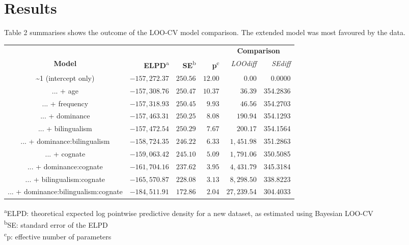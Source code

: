 \documentclass[
  english,
  man,man,floatsintext]{apa6}
\begin{document}
\hypertarget{results}{%
\section{Results}\label{results}}

Table 2 summarises shows the outcome of the LOO-CV model comparison. The extended model was most favoured by the data.

\captionsetup[table]{labelformat=empty,skip=1pt}
\begin{longtable}{crrrrr}
\toprule
& & & & \multicolumn{2}{c}{\textbf{Comparison}} \\ 
 \cmidrule(lr){5-6}
\textbf{Model} & \textbf{ELPD}\textsuperscript{a} & \textbf{SE}\textsuperscript{b} & \textbf{p}\textsuperscript{c} & \emph{LOOdiff} & \emph{SEdiff} \\ 
\midrule
\textasciitilde  1 (intercept only) & $-157,272.37$ & $250.56$ & $12.00$ & $0.00$ & 0.0000 \\ 
... + age & $-157,308.76$ & $250.47$ & $10.37$ & $36.39$ & 354.2836 \\ 
... + frequency & $-157,318.93$ & $250.45$ & $9.93$ & $46.56$ & 354.2703 \\ 
... + dominance & $-157,463.31$ & $250.25$ & $8.08$ & $190.94$ & 354.1293 \\ 
... + bilingualism & $-157,472.54$ & $250.29$ & $7.67$ & $200.17$ & 354.1564 \\ 
... + dominance:bilingualism & $-158,724.35$ & $246.22$ & $6.33$ & $1,451.98$ & 351.2863 \\ 
... + cognate & $-159,063.42$ & $245.10$ & $5.09$ & $1,791.06$ & 350.5085 \\ 
... + dominance:cognate & $-161,704.16$ & $237.62$ & $3.95$ & $4,431.79$ & 345.3184 \\ 
... + bilingualism:cognate & $-165,570.87$ & $228.08$ & $3.13$ & $8,298.50$ & 338.8223 \\ 
... + dominance:bilingualism:cognate & $-184,511.91$ & $172.86$ & $2.04$ & $27,239.54$ & 304.4033 \\ 
\bottomrule
\end{longtable}
\vspace{-5mm}
\begin{minipage}{\linewidth}
\textsuperscript{a}ELPD: theoretical expected log pointwise predictive density for a new dataset, as estimated using Bayesian LOO-CV \\ 
\textsuperscript{b}SE: standard error of the ELPD \\ 
\textsuperscript{c}p: effective number of parameters \\ 
\end{minipage}
\end{document}

